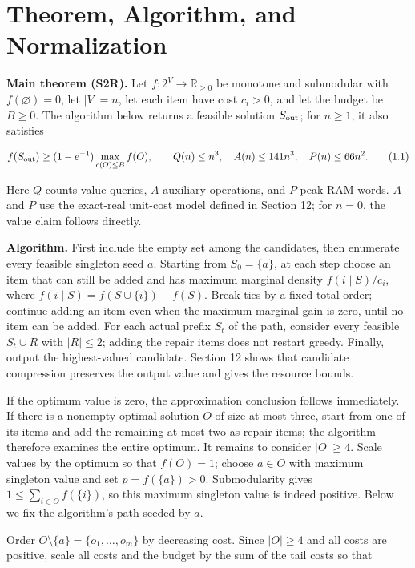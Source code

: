 \documentclass[11pt,a4paper]{article}
\begin{document}
\section{Theorem, Algorithm, and Normalization}

\textbf{Main theorem (S2R).} Let $f:2^V\to\mathbb R_{\ge0}$ be monotone and submodular with $f(\varnothing)=0$, let $|V|=n$, let each item have cost $c_i>0$, and let the budget be $B\ge0$. The algorithm below returns a feasible solution $S_{\rm out}$; for $n\ge1$, it also satisfies

\begin{equation}
f(S_{\rm out})\ge(1-e^{-1})\max_{c(O)\le B}f(O),\qquad
Q(n)\le n^3,\quad A(n)\le141n^3,\quad P(n)\le66n^2.
\tag{1.1}
\end{equation}

Here $Q$ counts value queries, $A$ auxiliary operations, and $P$ peak RAM words. $A$ and $P$ use the exact-real unit-cost model defined in Section 12; for $n=0$, the value claim follows directly.

\textbf{Algorithm.} First include the empty set among the candidates, then enumerate every feasible singleton seed $a$. Starting from $S_0=\{a\}$, at each step choose an item that can still be added and has maximum marginal density $f(i\mid S)/c_i$, where $f(i\mid S)=f(S\cup\{i\})-f(S)$. Break ties by a fixed total order; continue adding an item even when the maximum marginal gain is zero, until no item can be added. For each actual prefix $S_t$ of the path, consider every feasible $S_t\cup R$ with $|R|\le2$; adding the repair items does not restart greedy. Finally, output the highest-valued candidate. Section 12 shows that candidate compression preserves the output value and gives the resource bounds.

If the optimum value is zero, the approximation conclusion follows immediately. If there is a nonempty optimal solution $O$ of size at most three, start from one of its items and add the remaining at most two as repair items; the algorithm therefore examines the entire optimum. It remains to consider $|O|\ge4$. Scale values by the optimum so that $f(O)=1$; choose $a\in O$ with maximum singleton value and set $p=f(\{a\})>0$. Submodularity gives $1\le\sum_{i\in O}f(\{i\})$, so this maximum singleton value is indeed positive. Below we fix the algorithm's path seeded by $a$.

Order $O\setminus\{a\}=\{o_1,\ldots,o_m\}$ by decreasing cost. Since $|O|\ge4$ and all costs are positive, scale all costs and the budget by the sum of the tail costs so that
\end{document}
